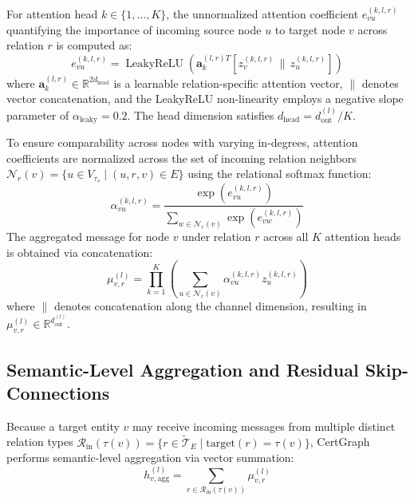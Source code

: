 For attention head $k \in \{1, \dots, K\}$, the unnormalized attention coefficient $e_{vu}^{(k, l, r)}$ quantifying the importance of incoming source node $u$ to target node $v$ across relation $r$ is computed as:
\begin{equation}
e_{vu}^{(k, l, r)} = \operatorname{LeakyReLU} \left( \mathbf{a}_k^{(l, r) T} \left[ z_v^{(k, l, r)} \,\|\, z_u^{(k, l, r)} \right] \right)
\end{equation}
where $\mathbf{a}_k^{(l, r)} \in \mathbb{R}^{2 d_{\text{head}}}$ is a learnable relation-specific attention vector, $\|$ denotes vector concatenation, and the LeakyReLU non-linearity employs a negative slope parameter of $\alpha_{\text{leaky}} = 0.2$. The head dimension satisfies $d_{\text{head}} = d_{\text{out}}^{(l)} / K$.

To ensure comparability across nodes with varying in-degrees, attention coefficients are normalized across the set of incoming relation neighbors $\mathcal{N}_r(v) = \{u \in V_{\tau_s} \mid (u, r, v) \in E\}$ using the relational softmax function:
\begin{equation}
\alpha_{vu}^{(k, l, r)} = \frac{\exp \left( e_{vu}^{(k, l, r)} \right)}{\sum_{w \in \mathcal{N}_r(v)} \exp \left( e_{vw}^{(k, l, r)} \right)}
\end{equation}
The aggregated message for node $v$ under relation $r$ across all $K$ attention heads is obtained via concatenation:
\begin{equation}
\mu_{v, r}^{(l)} = \prod_{k=1}^K \left( \sum_{u \in \mathcal{N}_r(v)} \alpha_{vu}^{(k, l, r)} z_u^{(k, l, r)} \right)
\end{equation}
where $\|$ denotes concatenation along the channel dimension, resulting in $\mu_{v, r}^{(l)} \in \mathbb{R}^{d_{\text{out}}^{(l)}}$.

\subsection{Semantic-Level Aggregation and Residual Skip-Connections}
Because a target entity $v$ may receive incoming messages from multiple distinct relation types $\mathcal{R}_{\text{in}}(\tau(v)) = \{r \in \tilde{\mathcal{T}}_E \mid \text{target}(r) = \tau(v)\}$, CertGraph performs semantic-level aggregation via vector summation:
\begin{equation}
h_{v, \text{agg}}^{(l)} = \sum_{r \in \mathcal{R}_{\text{in}}(\tau(v))} \mu_{v, r}^{(l)}
\end{equation}

